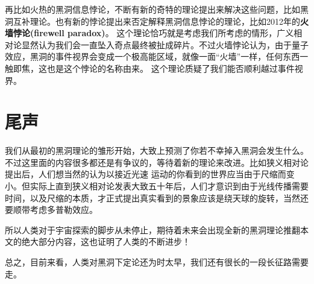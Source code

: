 \documentclass{ctexart}
\begin{document}
    再比如火热的黑洞信息悖论，不断有新的奇特的理论提出来解决这些问题，比如黑洞互补理论。也有新的悖论提出来否定解释黑洞信息悖论的理论，比如2012年的\textbf{火墙悖论(firewell paradox)}。\cite{almheiri2013black}
    这个理论恰巧就是考虑我们所考虑的情形，广义相对论显然认为我们会一直坠入奇点最终被扯成碎片。不过火墙悖论认为，由于量子效应，黑洞的事件视界会变成一个极高能区域，就像一面“火墙”一样，任何东西一触即焦，这也是这个悖论的名称由来。
    这个理论质疑了我们能否顺利越过事件视界。

    \section{尾声}
    我们从最初的黑洞理论的雏形开始，大致上预测了你若不幸掉入黑洞会发生什么。不过这里面的内容很多都还是有争议的，等待着新的理论来改进。比如狭义相对论提出后，人们想当然的认为以接近光速
    运动的你看到的世界应当由于尺缩而变小。但实际上直到狭义相对论发表大致五十年后，人们才意识到由于光线传播需要时间，以及尺缩的本质，才正式提出真实看到的景象应该是绕天球的旋转\cite{terrell1959invisibility}，当然还要顺带考虑多普勒效应。
    
    所以人类对于宇宙探索的脚步从未停止，期待着未来会出现全新的黑洞理论推翻本文的绝大部分内容，这也证明了人类的不断进步！
    
    总之，目前来看，人类对黑洞下定论还为时太早，我们还有很长的一段长征路需要走。

    
    
\end{document}
